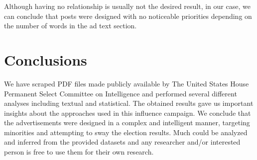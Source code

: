 \documentclass[12pt]{article}
\theoremstyle{definition}
\begin{document}
\bigskip

Although having no relationship is usually not the desired result, in our case,
we can conclude that posts were designed with no noticeable priorities
depending on the number of words in the ad text section.


\section*{\centering Conclusions}

We have scraped PDF files made publicly available by The United States House
Permanent Select Committee on Intelligence and performed several different
analyses including textual and statistical. The obtained results gave us
important insights about the approaches used in this influence campaign.
We conclude that the advertisements were designed in a complex and intelligent
manner, targeting minorities and attempting to sway the election results. Much
could be analyzed and inferred from the provided datasets and any researcher
and/or interested person is free to use them for their own research.


\newpage

\begin{center}
\printbibliography[heading=bibintoc]
\end{center}

\end{document}
